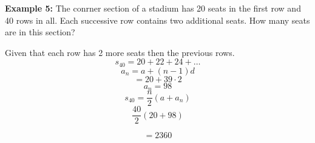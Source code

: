 \documentclass{report}
\begin{document}
\begin{large}
	\noindent \textbf{Example 5:}
	The conrner section of a stadium has 20 seats in the first row and 40 rows in all. Each successive row contains two additional seats. How many seats are in this section?
\end{large}
\vspace{4mm}


Given that each row has 2 more seats then the previous rows.
$$s_{40} = 20 +22+24+\ldots$$
$$a_n = a +(n-1)d$$
$$ = 20 +39 \cdot 2$$
$$a_n = 98$$
$$s_{40} = \frac{n}{2}(a+a_n)$$
$$\frac{40}{2}(20+98)$$

$$ = \boxed{2360}$$
\end{document}
